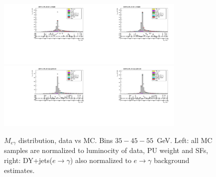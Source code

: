 \begin{figure}[htb]
\begin{center}
    \includegraphics[width=0.40\textwidth]{../figs/figs_v11/ELECTRON_WGamma/PrepareYields/c_TotalDATAvsMC_Barrel__Mpholep1PRELIMINARY_FOR_E_TO_GAMMA_WITH_PSV_CUT_pt45to55_.pdf}\includegraphics[width=0.40\textwidth]{../figs/figs_v11/ELECTRON_WGamma/PrepareYields/c_TotalDATAvsMC_Barrel__Mpholep1PRELIMINARY_FOR_E_TO_GAMMA_WITH_PSV_CUT_pt45to55__etogScale.pdf}\\
    \includegraphics[width=0.40\textwidth]{../figs/figs_v11/ELECTRON_WGamma/PrepareYields/c_TotalDATAvsMC_Endcap__Mpholep1PRELIMINARY_FOR_E_TO_GAMMA_WITH_PSV_CUT_pt45to55_.pdf}\includegraphics[width=0.40\textwidth]{../figs/figs_v11/ELECTRON_WGamma/PrepareYields/c_TotalDATAvsMC_Endcap__Mpholep1PRELIMINARY_FOR_E_TO_GAMMA_WITH_PSV_CUT_pt45to55__etogScale.pdf}\\
   \label{fig:Mpholep1DatavsMC_35to75}
  \caption{$M_{e\gamma}$ distribution, data vs MC. Bins $35-45-55$~GeV. Left: all MC samples are normalized to luminocity of data, PU weight and SFs, right: DY+jets($e\rightarrow\gamma$) also normalized to $e\rightarrow\gamma$ background estimates.}
  \end{center}
\end{figure}


